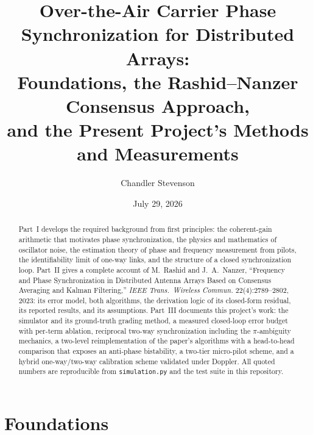 \documentclass[10pt]{article}
\title{Over-the-Air Carrier Phase Synchronization for Distributed Arrays:\\
Foundations, the Rashid--Nanzer Consensus Approach,\\
and the Present Project's Methods and Measurements}
\author{Chandler Stevenson}
\date{July 29, 2026}
\newcommand{\code}[1]{\texttt{#1}}
\begin{document}
\maketitle

\begin{abstract}
\noindent Part~I develops the required background from first principles:
the coherent-gain arithmetic that motivates phase synchronization, the
physics and mathematics of oscillator noise, the estimation theory of
phase and frequency measurement from pilots, the identifiability limit of
one-way links, and the structure of a closed synchronization loop. Part~II
gives a complete account of M.~Rashid and J.~A.~Nanzer, ``Frequency and
Phase Synchronization in Distributed Antenna Arrays Based on Consensus
Averaging and Kalman Filtering,'' \emph{IEEE Trans.\ Wireless Commun.}
22(4):2789--2802, 2023: its error model, both algorithms, the derivation
logic of its closed-form residual, its reported results, and its
assumptions. Part~III documents this project's work: the simulator and its
ground-truth grading method, a measured closed-loop error budget with
per-term ablation, reciprocal two-way synchronization including the
$\pi$-ambiguity mechanics, a two-level reimplementation of the paper's
algorithms with a head-to-head comparison that exposes an anti-phase
bistability, a two-tier micro-pilot scheme, and a hybrid one-way/two-way
calibration scheme validated under Doppler. All quoted numbers are
reproducible from \code{simulation.py} and the test suite in this
repository.
\end{abstract}

\tableofcontents

\part{Foundations}
\end{document}
